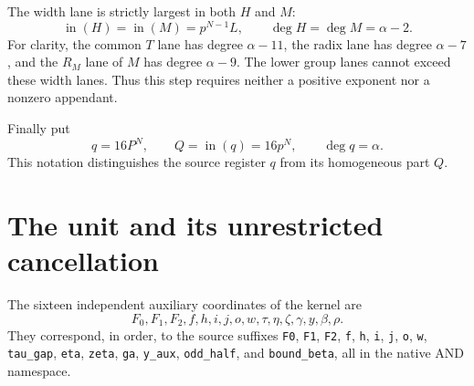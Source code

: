 \documentclass[11pt,letterpaper]{article}
\theoremstyle{definition}\newtheorem{definition}[theorem]{Definition}
\theoremstyle{remark}\newtheorem{remark}[theorem]{Remark}
\newcommand{\topf}[1]{\operatorname{in}(#1)}
\newcommand{\fnameB}[1]{{\small\nolinkurl{#1}}}
\begin{document}
The width lane is strictly largest in both $H$ and $M$:
\begin{equation}\label{fup:dl:eq:HMtop}
 \topf{H}=\topf{M}=p^{N-1}L,
 \qquad \deg H=\deg M=\alpha-2.
\end{equation}
For clarity, the common $T$ lane has degree $\alpha-11$, the radix lane has degree $\alpha-7$, and the $R_M$ lane of $M$ has degree $\alpha-9$. The lower group lanes cannot exceed these width lanes. Thus this step requires neither a positive exponent nor a nonzero appendant.

Finally put
\begin{equation}\label{fup:dl:eq:Q}
 q=16P^N,\qquad Q=\topf{q}=16p^N,\qquad\deg q=\alpha.
\end{equation}
This notation distinguishes the source register $q$ from its homogeneous part $Q$.

\section{The unit and its unrestricted cancellation}\label{fup:dl:sec:kernel}
The sixteen independent auxiliary coordinates of the kernel are
\[
 F_0,F_1,F_2,f,h,i,j,o,w,\tau,\eta,\zeta,\gamma,y,\beta,\rho.
\]
They correspond, in order, to the source suffixes \fnameB{F0}, \fnameB{F1}, \fnameB{F2}, \fnameB{f}, \fnameB{h}, \fnameB{i}, \fnameB{j}, \fnameB{o}, \fnameB{w}, \fnameB{tau_gap}, \fnameB{eta}, \fnameB{zeta}, \fnameB{ga}, \fnameB{y_aux}, \fnameB{odd_half}, and \fnameB{bound_beta}, all in the native AND namespace.
\end{document}
